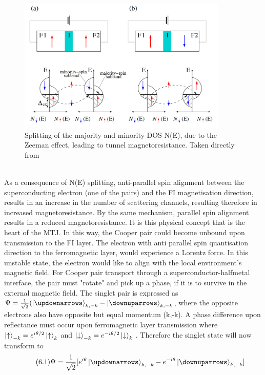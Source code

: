 \documentclass[12pt]{article}
\begin{document}
\begin{figure}[htp]
    \centering
    \begin{measuredfigure}
    \includegraphics[width=10cm]{dos}
    \caption{Splitting of the majority and minority DOS N(E), due to the Zeeman effect, leading to tunnel magnetoresistance. Taken directly from \cite{fundapp}}
    \end{measuredfigure}
    \end{figure}
\\
As a consequence of N(E) splitting, anti-parallel spin alignment between the superconducting electron (one of the pairs) and the FI magnetisation direction, results in an increase in the number of scattering channels, resulting therefore in increased magnetoresistance. By the same mechanism, parallel spin alignment results in a reduced magnetoresistance. It is this physical concept that is the heart of the MTJ. In this way, the Cooper pair could become unbound upon transmission to the FI layer. The electron with anti parallel spin quantisation direction to the ferromagnetic layer, would experience a Lorentz force. In this unstable state, the electron would like to align with the local environment's magnetic field. For Cooper pair transport through a superconductor-halfmetal\cite{HM} interface, the pair must "rotate" and pick up a phase, if it is to survive in the external magnetic field. The singlet pair is expressed as $\Psi=\frac{1}{\sqrt{2}}(\ket{\updownarrows}_{k,-k}- \ket{\downuparrows}_{k,-k}$, where the opposite electrons also have opposite but equal momentum (k,-k)\cite{BCS}. A phase difference upon reflectance must occur upon ferromagnetic layer transmission where $\ket{\uparrow}_{-k}=e^{i\theta/2}\ket{\uparrow}_k$ and $\ket{\downarrow}_{-k}=e^{-i\theta/2}\ket{\downarrow}_k$ \cite{contact}. Therefore the singlet state will now transform to
\begin{equation} \label{4.1} \tag{6.1}
\Psi=\frac{1}{\sqrt{2}}[e^{i\theta}\ket{\updownarrows}_{k,-k}- e^{-i\theta}\ket{\downuparrows}_{k,-k}]
\end{equation}
\end{document}
